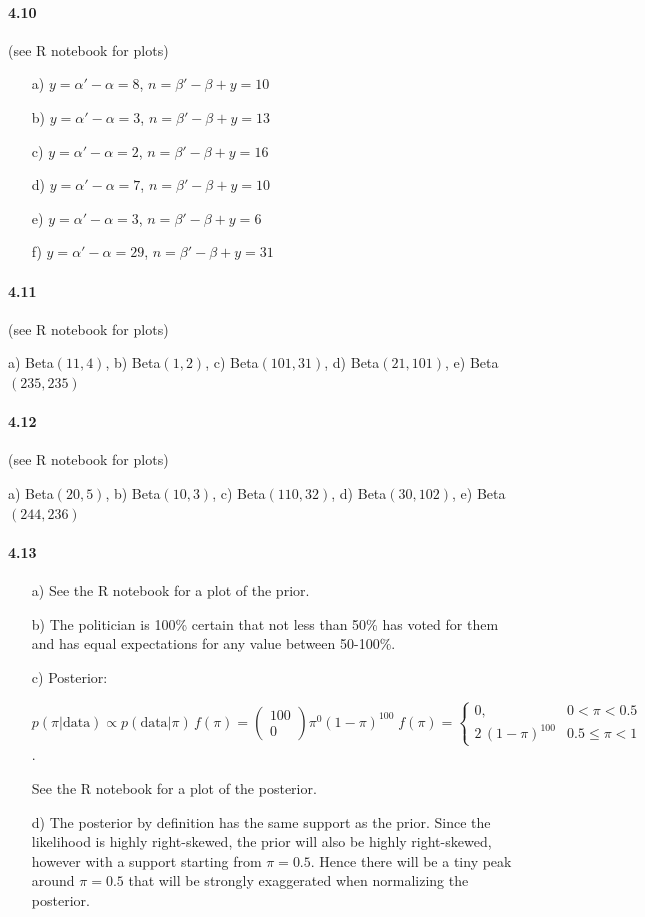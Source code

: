 \documentclass[fontsize=11pt,DIV=18,parskip=half]{scrartcl}
\begin{document}
\paragraph{4.10} (see R notebook for plots)
\begin{enumerate}
\item[a)] $y = \alpha'-\alpha = 8$, $n = \beta'-\beta+y = 10$
\item[b)] $y = \alpha'-\alpha = 3$, $n = \beta'-\beta+y = 13$
\item[c)] $y = \alpha'-\alpha = 2$, $n = \beta'-\beta+y = 16$
\item[d)] $y = \alpha'-\alpha = 7$, $n = \beta'-\beta+y = 10$
\item[e)] $y = \alpha'-\alpha = 3$, $n = \beta'-\beta+y = 6$
\item[f)] $y = \alpha'-\alpha = 29$, $n = \beta'-\beta+y = 31$
\end{enumerate}

\paragraph{4.11} (see R notebook for plots)

a) Beta$(11,4)$, b) Beta$(1,2)$, c) Beta$(101, 31)$, d) Beta$(21, 101)$, e) Beta$(235, 235)$

\paragraph{4.12} (see R notebook for plots)

a) Beta$(20,5)$, b) Beta$(10,3)$, c) Beta$(110, 32)$, d) Beta$(30, 102)$, e) Beta$(244, 236)$

\paragraph{4.13}
\begin{enumerate}
\item[a)] See the R notebook for a plot of the prior.
\item[b)] The politician is 100\% certain that not less than 50\% has voted for them and has equal expectations for any value between 50-100\%.
\item[c)] Posterior: 

$p(\pi|\text{data}) \propto p(\text{data}|\pi) \, f(\pi) = \begin{pmatrix}100 \\ 0\end{pmatrix} \pi^0 (1-\pi)^{100} \; f(\pi) = \left\{  \begin{array}{ll} 0, & 0 < \pi < 0.5\\ 2\,(1-\pi)^{100} & 0.5 \leq \pi < 1 \end{array}\right.$.

See the R notebook for a plot of the posterior.
\item[d)] The posterior by definition has the same support as the prior. Since the likelihood is highly right-skewed, the prior will also be highly right-skewed, however with a support starting from $\pi=0.5$. Hence there will be a tiny peak around $\pi=0.5$ that will be strongly exaggerated when normalizing the posterior.
\end{enumerate}
\end{document}
